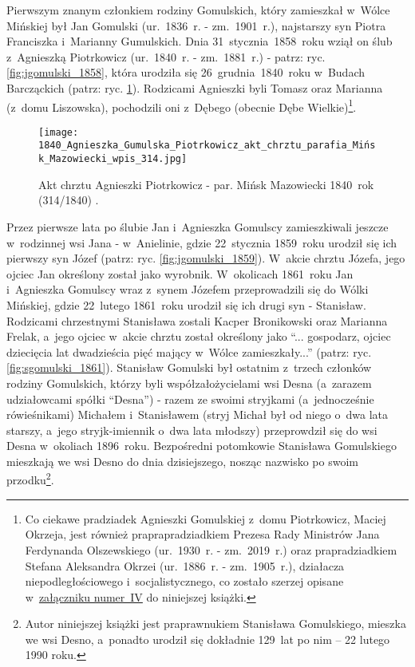 Pierwszym znanym członkiem rodziny Gomulskich, który zamieszkał w~Wólce
Mińskiej był Jan Gomulski (ur.~1836~r. - zm.~1901~r.), najstarszy syn Piotra
Franciszka i~Marianny Gumulskich. Dnia 31~stycznia~1858~roku wziął on ślub
z~Agnieszką Piotrkowicz (ur.~1840~r. - zm.~1881~r.) - patrz: ryc.
\ref{fig:jgomulski_1858}, która urodziła się 26~grudnia~1840~roku w~Budach
Barcząckich (patrz: ryc. \ref{fig:agumulska_1840}). Rodzicami Agnieszki byli
Tomasz oraz Marianna (z~domu Liszowska), pochodzili oni z~Dębego (obecnie Dębe
Wielkie)\footnote{Co ciekawe pradziadek Agnieszki Gomulskiej z~domu
Piotrkowicz, Maciej Okrzeja, jest również praprapradziadkiem Prezesa Rady
Ministrów Jana Ferdynanda Olszewskiego (ur.~1930~r. - zm.~2019~r.) oraz
prapradziadkiem Stefana Aleksandra Okrzei (ur.~1886~r. - zm.~1905~r.),
działacza niepodległościowego i~socjalistycznego, co zostało szerzej opisane
w~\hyperref[sec:piotrkowicze]{załączniku numer~IV} do niniejszej książki.}.

\begin{figure}[!ht]
    \vspace*{0.5cm}
    \centering \texttt{[image: 
        1840\_Agnieszka\_Gumulska\_Piotrkowicz\_akt\_chrztu\_parafia\_Mińsk\_Mazowiecki\_wpis\_314.jpg]}
    \captionsetup{format=hang}
    \caption{Akt chrztu Agnieszki Piotrkowicz - par. Mińsk Mazowiecki 
    1840~rok (314/1840) 
    \cite{par_minsk2}.}
    \label{fig:agumulska_1840}
\end{figure}

Przez pierwsze lata po ślubie Jan i~Agnieszka Gomulscy zamieszkiwali jeszcze
w~rodzinnej wsi Jana - w~Anielinie, gdzie 22~stycznia 1859~roku urodził się
ich pierwszy syn Józef (patrz: ryc. \ref{fig:jgomulski_1859}). W~akcie chrztu
Józefa, jego ojciec Jan określony został jako wyrobnik. W~okolicach 1861~roku
Jan i~Agnieszka Gomulscy wraz z~synem Józefem przeprowadzili się do Wólki 
Mińskiej, gdzie 22~lutego 1861~roku urodził się ich drugi syn - Stanisław. 
Rodzicami chrzestnymi Stanisława zostali Kacper Bronikowski oraz Marianna
Frelak, a~jego ojciec w~akcie chrztu został określony jako \enquote{...
gospodarz, ojciec dziecięcia lat dwadzieścia pięć mający w~Wólce
zamieszkały...} (patrz: ryc. \ref{fig:sgomulski_1861}). Stanisław Gomulski był
ostatnim z~trzech członków rodziny Gomulskich, którzy byli współzałożycielami
wsi Desna (a~zarazem udziałowcami spółki \enquote{Desna}) - razem ze swoimi
stryjkami (a~jednocześnie rówieśnikami) Michałem i~Stanisławem (stryj Michał
był od niego o~dwa lata starszy, a~jego stryjk-imiennik o~dwa lata młodszy)
przeprowdził się do wsi Desna w~okoliach 1896~roku. Bezpośredni potomkowie
Stanisława Gomulskiego mieszkają we wsi Desno do dnia dzisiejszego, nosząc
nazwisko po swoim przodku\footnote{Autor niniejszej książki jest
praprawnukiem Stanisława Gomulskiego, mieszka we wsi Desno, a~ponadto urodził
się dokładnie 129~lat po nim – 22 lutego 1990 roku.}.

